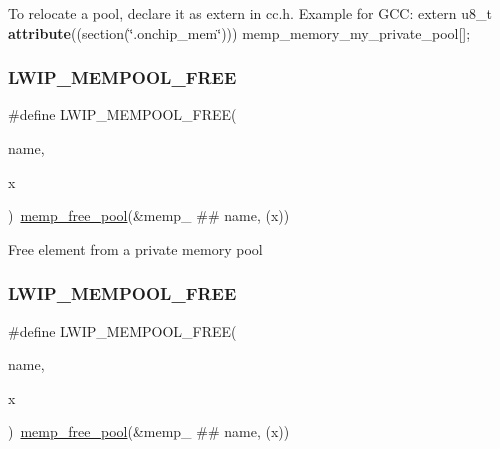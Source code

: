 To relocate a pool, declare it as extern in cc.\+h. Example for G\+CC\+: extern u8\+\_\+t {\bfseries attribute}((section(\char`\"{}.\+onchip\+\_\+mem\char`\"{}))) memp\+\_\+memory\+\_\+my\+\_\+private\+\_\+pool\mbox{[}\mbox{]}; \mbox{\label{group__mempool_gaa43d114dd702fbd8f1db18474ea93a04}} 
\subsubsection{\texorpdfstring{L\+W\+I\+P\+\_\+\+M\+E\+M\+P\+O\+O\+L\+\_\+\+F\+R\+EE}{LWIP\_MEMPOOL\_FREE}\hspace{0.1cm}{\footnotesize\ttfamily [1/2]}}
{\footnotesize\ttfamily \#define L\+W\+I\+P\+\_\+\+M\+E\+M\+P\+O\+O\+L\+\_\+\+F\+R\+EE(\begin{DoxyParamCaption}\item[{}]{name,  }\item[{}]{x }\end{DoxyParamCaption})~\hyperlink{openmote-cc2538_2lwip_2src_2include_2lwip_2priv_2memp__priv_8h_a62f8c3c907743e34eee3cdac7fa1eaa5}{memp\+\_\+free\+\_\+pool}(\&memp\+\_\+ \#\# name, (x))}

Free element from a private memory pool \mbox{\label{group__mempool_gaa43d114dd702fbd8f1db18474ea93a04}} 
\subsubsection{\texorpdfstring{L\+W\+I\+P\+\_\+\+M\+E\+M\+P\+O\+O\+L\+\_\+\+F\+R\+EE}{LWIP\_MEMPOOL\_FREE}\hspace{0.1cm}{\footnotesize\ttfamily [2/2]}}
{\footnotesize\ttfamily \#define L\+W\+I\+P\+\_\+\+M\+E\+M\+P\+O\+O\+L\+\_\+\+F\+R\+EE(\begin{DoxyParamCaption}\item[{}]{name,  }\item[{}]{x }\end{DoxyParamCaption})~\hyperlink{openmote-cc2538_2lwip_2src_2include_2lwip_2priv_2memp__priv_8h_a62f8c3c907743e34eee3cdac7fa1eaa5}{memp\+\_\+free\+\_\+pool}(\&memp\+\_\+ \#\# name, (x))}


